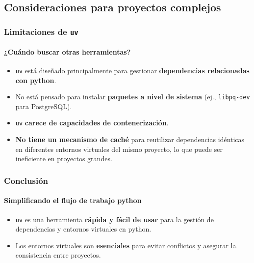 \documentclass{beamer}
\begin{document}
\subsection{Consideraciones para proyectos complejos}
\frame
{
    \frametitle{Limitaciones de \texttt{uv}}
    \framesubtitle{¿Cuándo buscar otras herramientas?}
    \begin{itemize}
        \item \texttt{uv} está diseñado principalmente para gestionar \textbf{dependencias relacionadas con python}.
        \item No está pensado para instalar \textbf{paquetes a nivel de sistema} (ej., \texttt{libpq-dev} para PostgreSQL).
        \item \texttt{uv} \textbf{carece de capacidades de contenerización}.
        \item \textbf{No tiene un mecanismo de caché} para reutilizar dependencias idénticas en diferentes entornos virtuales del mismo proyecto, lo que puede ser ineficiente en proyectos grandes.
    \end{itemize}
}

\frame
{
    \frametitle{Conclusión}
    \framesubtitle{Simplificando el flujo de trabajo python}
    \begin{itemize}
        \item \texttt{uv} es una herramienta \textbf{rápida y fácil de usar} para la gestión de dependencias y entornos virtuales en python.
        \item Los entornos virtuales son \textbf{esenciales} para evitar conflictos y asegurar la consistencia entre proyectos.
    \end{itemize}
}
\end{document}
